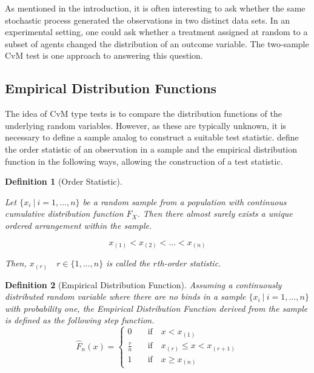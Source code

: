 \documentclass[12pt, a4paper]{article}
\theoremstyle{MAstyle} \newtheorem{assumption}{Assumption}[section]
\theoremstyle{MAstyle} \newtheorem{definition}{Definition}[section]
\theoremstyle{MAstyle} \newtheorem{theorem}{Theorem}[section]
\begin{document}
		As mentioned in the introduction, it is often interesting to ask whether the same stochastic process generated the observations in two distinct data sets. In an experimental setting, one could ask whether a treatment assigned at random to a subset of agents changed the distribution of an outcome variable. 
		The two-sample CvM test is one approach to answering this question. 

		\subsection{Empirical Distribution Functions}
			The idea of CvM type tests is to compare the distribution functions of the underlying random variables. However, as these are typically unknown, it is necessary to define a sample analog to construct a suitable test statistic.
			\cite{gibbons_nonparametric_2021} define the order statistic of an observation in a sample and the empirical distribution function in the following ways, allowing the construction of a test statistic.
			\begin{definition}[Order Statistic]\label{Order_Stat}
				
				Let $\{x_i \: \vert \: i = 1, \dots , n\}$ be a random sample from a population with continuous cumulative distribution function $F_X$. Then there almost surely exists a unique ordered arrangement within the sample. 
				
				$$x_{(1)} < x_{(2)} < \dots < x_{(n)}$$
				
				Then, $x_{(r)} \quad r \in \{1, \dots, n\}$ is called the $r$th-order statistic.	
			\end{definition}
		
			\begin{definition}[Empirical Distribution Function]
				Assuming a continuously distributed random variable where there are no binds in a sample $\{x_i \: \vert \: i = 1, \dots , n\}$ with probability one, the Empirical Distribution Function derived from the sample is defined as the following step function.
				\begin{equation}
					\hat{F}_{n}(x) = \begin{cases}
						0 & \quad \text{if} \quad  x < x_{(1)} \\
						\frac{r}{n} & \quad \text{if} \quad  x_{(r)} \leq x < x_{(r + 1)} \\
						1 & \quad \text{if} \quad  x \geq x_{(n)} 
					\end{cases}
				\end{equation}
			\end{definition}
		
\end{document}
